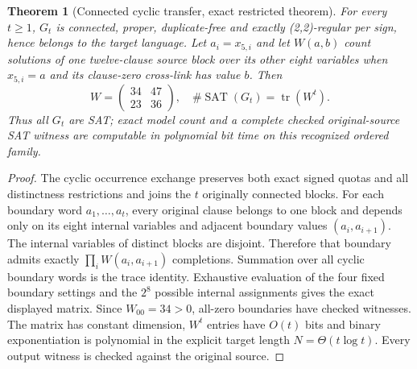 \documentclass[11pt]{article}
\newtheorem{theorem}{Theorem}
\begin{document}
\begin{theorem}[Connected cyclic transfer, exact restricted theorem]
For every $t\ge1$, $G_t$ is connected, proper, duplicate-free and exactly (2,2)-regular per sign, hence belongs to the target language. Let $a_i=x_{5,i}$ and let $W(a,b)$ count solutions of one twelve-clause source block over its other eight variables when $x_{5,i}=a$ and its clause-zero cross-link has value $b$. Then
\[
 W=\begin{pmatrix}34&47\\23&36\end{pmatrix},
 \quad \#\operatorname{SAT}(G_t)=\operatorname{tr}(W^t).
\]
Thus all $G_t$ are SAT; exact model count and a complete checked original-source SAT witness are computable in polynomial bit time on this recognized ordered family.
\end{theorem}
\begin{proof}
The cyclic occurrence exchange preserves both exact signed quotas and all distinctness restrictions and joins the $t$ originally connected blocks. For each boundary word $a_1,\dots,a_t$, every original clause belongs to one block and depends only on its eight internal variables and adjacent boundary values $(a_i,a_{i+1})$. The internal variables of distinct blocks are disjoint. Therefore that boundary admits exactly $\prod_iW(a_i,a_{i+1})$ completions. Summation over all cyclic boundary words is the trace identity. Exhaustive evaluation of the four fixed boundary settings and the $2^8$ possible internal assignments gives the exact displayed matrix. Since $W_{00}=34>0$, all-zero boundaries have checked witnesses. The matrix has constant dimension, $W^t$ entries have $O(t)$ bits and binary exponentiation is polynomial in the explicit target length $N=\Theta(t\log t)$. Every output witness is checked against the original source.
\end{proof}
\end{document}
